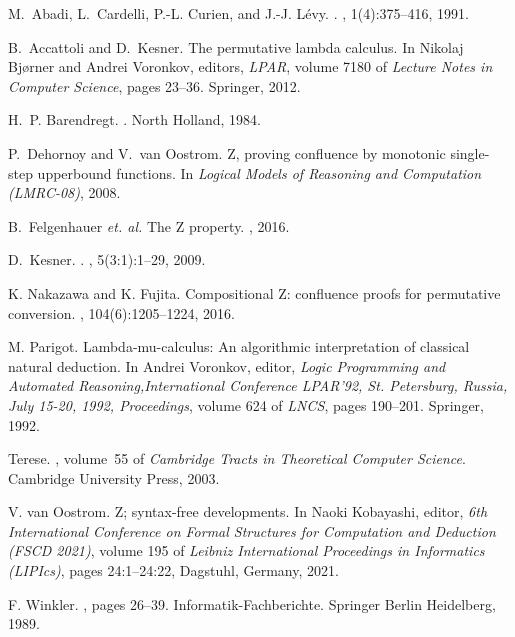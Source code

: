 \documentclass[a4paper]{article}
\begin{document}
% 
%

\begin{thebibliography}{FNvOS16}

M.~Abadi, L.~Cardelli, P.-L. Curien, and J.-J. L{\'e}vy.
.
, 1(4):375--416, 1991.

B.~Accattoli and D.~Kesner.
\newblock The permutative lambda calculus.
\newblock In Nikolaj Bj{\o}rner and Andrei Voronkov, editors, {\em LPAR},
  volume 7180 of {\em Lecture Notes in Computer Science}, pages 23--36.
  Springer, 2012.

H.~P. Barendregt.
.
\newblock North Holland, 1984.

P.~Dehornoy and V.~van Oostrom.
\newblock Z, proving confluence by monotonic single-step upperbound functions.
\newblock In {\em Logical Models of Reasoning and Computation (LMRC-08)}, 2008.

B.~Felgenhauer {\it et. al.}
\newblock The {Z} property.
, 2016.

D.~Kesner.
.
, 5(3:1):1--29, 2009.

K. Nakazawa and K. Fujita.
\newblock Compositional {Z:} confluence proofs for permutative conversion.
, 104(6):1205--1224, 2016.

M. Parigot.
\newblock Lambda-mu-calculus: An algorithmic interpretation of classical
  natural deduction.
\newblock In Andrei Voronkov, editor, {\em Logic Programming and Automated
  Reasoning,International Conference LPAR'92, St. Petersburg, Russia, July
  15-20, 1992, Proceedings}, volume 624 of {\em LNCS}, pages 190--201. Springer, 1992.

Terese.
, volume~55 of {\em Cambridge Tracts in
  Theoretical Computer Science}.
\newblock Cambridge University Press, 2003.

V. {van Oostrom}.
\newblock Z; syntax-free developments.
\newblock In Naoki Kobayashi, editor, {\em 6th International Conference on
  Formal Structures for Computation and Deduction ({{FSCD}} 2021)}, volume 195 of {\em Leibniz International Proceedings in Informatics ({{LIPIcs}})}, pages 24:1--24:22, {Dagstuhl, Germany}, 2021. 

F. Winkler.
, pages
  26--39.
\newblock Informatik-Fachberichte. Springer Berlin Heidelberg, 1989.

\end{thebibliography}
\end{document}
